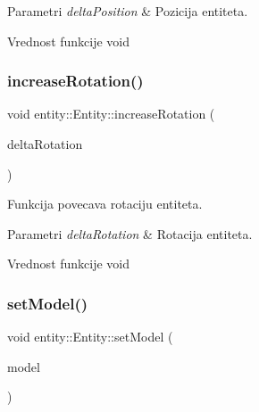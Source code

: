 \begin{DoxyParams}{Parametri}
{\em delta\+Position} & Pozicija entiteta. \\
\hline
\end{DoxyParams}
\begin{DoxyReturn}{Vrednost funkcije}
void 
\end{DoxyReturn}
\mbox{\label{classentity_1_1Entity_ac5bd766ea7810db89b8948160916768a}} 
\subsubsection{\texorpdfstring{increase\+Rotation()}{increaseRotation()}}
{\footnotesize\ttfamily void entity\+::\+Entity\+::increase\+Rotation (\begin{DoxyParamCaption}\item[{vec3}]{delta\+Rotation }\end{DoxyParamCaption})}



Funkcija povecava rotaciju entiteta. 


\begin{DoxyParams}{Parametri}
{\em delta\+Rotation} & Rotacija entiteta. \\
\hline
\end{DoxyParams}
\begin{DoxyReturn}{Vrednost funkcije}
void 
\end{DoxyReturn}
\mbox{\label{classentity_1_1Entity_a68bdcd0dcae978514e87ee53c60367e2}} 
\subsubsection{\texorpdfstring{set\+Model()}{setModel()}}
{\footnotesize\ttfamily void entity\+::\+Entity\+::set\+Model (\begin{DoxyParamCaption}\item[{\hyperlink{classmodel_1_1TexturedModel}{Textured\+Model} $\ast$}]{model }\end{DoxyParamCaption})}



